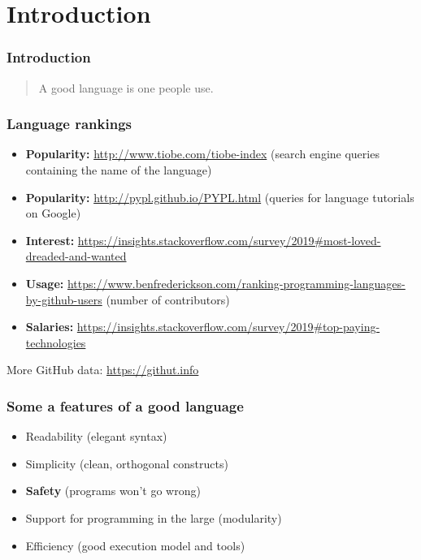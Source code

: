 \section{Introduction}



\begin{frame}
  \frametitle{Introduction}
  \begin{quotation}
    \Large
    A good language is one people use.
  \end{quotation}

\end{frame}

\begin{frame}
  \frametitle{Language rankings}

  \begin{itemize}[<+->]
  \item \textbf{Popularity:} \url{http://www.tiobe.com/tiobe-index}
    (search engine queries containing the name of the language)
  \item \textbf{Popularity:} \url{http://pypl.github.io/PYPL.html} (queries for language tutorials on Google)
  \item \textbf{Interest:}
    \url{https://insights.stackoverflow.com/survey/2019\#most-loved-dreaded-and-wanted}
  \item \textbf{Usage:} %
    \url{https://www.benfrederickson.com/ranking-programming-languages-by-github-users}
    (number of contributors)
  \item \textbf{Salaries:}
    \url{https://insights.stackoverflow.com/survey/2019\#top-paying-technologies}
  \end{itemize}
  \pause 
  More GitHub data: \url{https://githut.info}
\end{frame}

\begin{frame}
  \frametitle{Some a features of a good language}
  \begin{itemize}
  \item Readability (elegant syntax)
  \item Simplicity (clean, orthogonal constructs)
  \item \textbf{Safety} (programs won't go wrong)
  \item Support for programming in the large (modularity)
  \item Efficiency (good execution model and tools)
  \end{itemize}
\end{frame}


